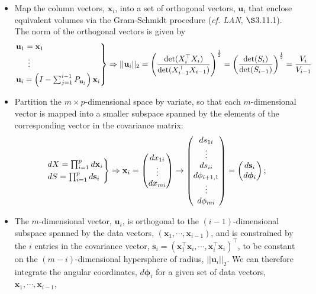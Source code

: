 \documentclass[12pt, twoside, draft]{article}
\begin{document}
\begin{itemize}
\item Map the column vectors, $\mathbf{x}_i$, into a set of orthogonal vectors, $\mathbf{u}_i$ that enclose equivalent volumes via the Gram-Schmidt procedure (\textit{cf. LAN}, $\S$3.11.1).  The norm of the orthogonal vectors is given by
\begin{equation}
\begin{rcases}
\mathbf{u}_1 = \mathbf{x}_1 \\
\hspace{15pt} \vdots \\
\mathbf{u}_i = \left( I - \sum_{j=1}^{i-1} P_{\mathbf{u}_j} \right) \mathbf{x}_i 
\end{rcases} \Rightarrow
|| \mathbf{u}_i ||_2 = \left( \frac{\operatorname{det}(X_i^\top X_i)}{\operatorname{det}(X_{i-1}^\top X_{i-1})} \right)^{\frac{1}{2}} = 
 \left( \frac{\operatorname{det}(S_i)}{\operatorname{det}(S_{i-1})} \right)^{\frac{1}{2}}  =  \frac{V_i}{V_{i-1}}
\end{equation}
\item Partition the $m \times p$-dimensional space by variate, so that each $m$-dimensional vector is mapped into a smaller subspace spanned by the elements of the corresponding vector in the covariance matrix:
\begin{equation}
\begin{rcases}
dX = \prod_{i=1}^p d \mathbf{x}_i \\
dS = \prod_{i=1}^p d \mathbf{s}_i
\end{rcases} \Rightarrow \mathbf{x}_i = \begin{pmatrix} dx_{1i} \\ \vdots \\ dx_{mi} \end{pmatrix} \rightarrow 
\begin{pmatrix} ds_{1i} \\ \vdots \\ ds_{ii} \\ d\phi_{i+1,1} \\ \vdots \\ d\phi_{mi} \end{pmatrix}
= \begin{pmatrix} d\mathbf{s}_i \\ d\boldsymbol{\phi}_i \end{pmatrix};
\end{equation}
\item The $m$-dimensional vector, $\mathbf{u}_i$, is orthogonal to the $(i-1)$-dimensional subspace spanned by the data vectors, $(\mathbf{x}_1, \cdots, \mathbf{x}_{i-1})$, and is constrained by the $i$  entries in the covariance vector, $\mathbf{s}_i = ( \mathbf{x}_1^\top \mathbf{x}_i, \cdots, \mathbf{x}_i^\top \mathbf{x}_i  )^\top$, to be constant on the $(m-i)$-dimensional hypersphere of radius, $||\mathbf{u}_i||_2$.  We can therefore integrate the angular coordinates, $d\boldsymbol{\phi}_i$ for a given set of data vectors, $\mathbf{x}_1, \cdots, \mathbf{x}_{i-1}$, 

\end{itemize}
\end{document}
